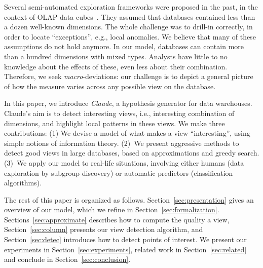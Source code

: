 Several semi-automated exploration frameworks were proposed in the
past, in the context of OLAP data cubes~\cite{sarawagi1998discovery,
imielinski2002cubegrades}. They assumed that databases contained less than a
dozen well-known dimensions.  The whole challenge was to drill-in correctly, in
order to locate ``exceptions'', e.g., local anomalies. We believe that many of
these assumptions do not hold anymore. In our model, databases can contain more
than a hundred dimensions with mixed types. Analysts have little to no
knowledge about the effects of these, even less about their combination.
Therefore, we seek \emph{macro}-deviations: our challenge is to depict a
general picture of how the measure varies across any possible view on the database.

In this paper, we introduce \textit{Claude}, a hypothesis generator for data
warehouses. Claude's aim is to detect interesting views, i.e., interesting
combination of dimensions, and highlight local patterns in these views. We make
three contributions: (1) We devise a model of what makes a view
``interesting'', using simple notions of information theory. (2)~We present
aggressive methods to detect good views in large data\-bases, based on
approximations and greedy search.  (3)~We apply our model to real-life
situations, involving either humans (data exploration by subgroup discovery) or
automatic predictors (classification algorithms).

The rest of this paper is organized as follows. Section~\ref{sec:presentation}
gives an overview of our model, which we refine in
Section~\ref{sec:formalization}. Sections~\ref{sec:approximate} describes how
to compute the quality a view, Section~\ref{sec:column} presents our view
detection algorithm, and Section~\ref{sec:detec} introduces how to detect
points of interest. We present our experiments in
Section~\ref{sec:experiments}, related work in Section~\ref{sec:related} and
conclude in Section~\ref{sec:conclusion}.


